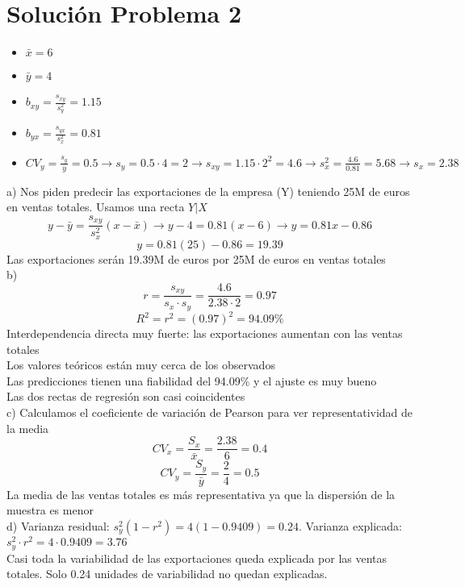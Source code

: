 \documentclass[fleqn]{article}
\begin{document}
	\section{Solución Problema 2}
	\begin{itemize}
		\item $\bar{x} = 6$
		\item $\bar{y} = 4$
		\item $b_{xy} = \frac{s_{xy}}{s_y^2} = 1.15$
		\item $b_{yx} = \frac{s_{yx}}{s_x^2} = 0.81$
		\item $CV_y = \frac{s_y}{\bar{y}} = 0.5 \rightarrow s_y = 0.5 \cdot 4 = 2 \rightarrow s_{xy} = 1.15 \cdot 2^2 = 4.6 \rightarrow s_x^2 = \frac{4.6}{0.81} = 5.68 \rightarrow s_x = 2.38$
	\end{itemize}
	a) Nos piden predecir las exportaciones de la empresa (Y) teniendo 25M de euros en ventas totales. Usamos una recta $Y | X$ \\
	\[
	y - \bar{y} = \frac{s_{xy}}{s_x^{2}} (x - \bar{x}) \rightarrow y - 4 = 0.81(x - 6) \rightarrow y = 0.81x - 0.86
	\]
	\[
	y = 0.81(25) - 0.86 = 19.39
	\]
	Las exportaciones serán 19.39M de euros por 25M de euros en ventas totales \\
	b)
	\[
	r = \frac{s_{xy}}{s_x \cdot s_y} = \frac{4.6}{2.38 \cdot 2} = \boxed{0.97}
	\]
	\[
	R^2 = r^2 = (0.97)^{2} = \boxed{94.09\%}
	\]
	Interdependencia directa muy fuerte: las exportaciones aumentan con las ventas totales \\
	Los valores teóricos están muy cerca de los observados \\
	Las predicciones tienen una fiabilidad del 94.09\% y el ajuste es muy bueno \\
	Las dos rectas de regresión son casi coincidentes \\
	c) Calculamos el coeficiente de variación de Pearson para ver representatividad de la media
	\[
	CV_x = \frac{S_x}{\bar{x}} = \frac{2.38}{6} = 0.4
	\] 
	\[
	CV_y = \frac{S_y}{\bar{y}} = \frac{2}{4} = 0.5
	\]
	La media de las ventas totales es más representativa ya que la dispersión de la muestra es menor \\
	d) Varianza residual: $s_y^2(1-r^2) = 4(1-0.9409) = 0.24$. Varianza explicada: $s_y^2 \cdot r^2 = 4 \cdot 0.9409 = 3.76$ \\
	Casi toda la variabilidad de las exportaciones queda explicada por las ventas totales. Solo 0.24 unidades de variabilidad no quedan explicadas.
\end{document}
